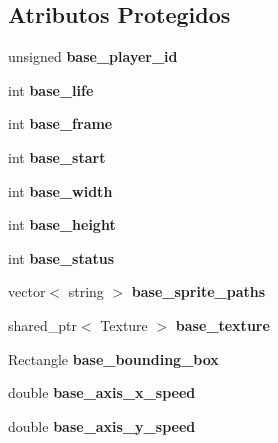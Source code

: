\subsection*{Atributos Protegidos}
\begin{DoxyCompactItemize}
\item 
\mbox{\label{classBase_abfe4b56e9035242ac9a5ceb774ead189}} 
unsigned {\bfseries base\+\_\+player\+\_\+id}
\item 
\mbox{\label{classBase_a3a5ef7ba44286d75ac91b314e8f9bba5}} 
int {\bfseries base\+\_\+life}
\item 
\mbox{\label{classBase_a25115b97013a8f9c19485992943b7bee}} 
int {\bfseries base\+\_\+frame}
\item 
\mbox{\label{classBase_ae6825b079b31eb5e2295fe74000331b6}} 
int {\bfseries base\+\_\+start}
\item 
\mbox{\label{classBase_af14e8b3b3f8e64b94a4a3a5053ffc100}} 
int {\bfseries base\+\_\+width}
\item 
\mbox{\label{classBase_a8af1088a92883b0fec24293143071aab}} 
int {\bfseries base\+\_\+height}
\item 
\mbox{\label{classBase_a0db4876e47d72f19c0959b12c7b8128f}} 
int {\bfseries base\+\_\+status}
\item 
\mbox{\label{classBase_a8010ab166f9a8468d6b1006a6f8efa83}} 
vector$<$ string $>$ {\bfseries base\+\_\+sprite\+\_\+paths}
\item 
\mbox{\label{classBase_a1b641692d4aa3de6b0eb3c9f9ca5d164}} 
shared\+\_\+ptr$<$ Texture $>$ {\bfseries base\+\_\+texture}
\item 
\mbox{\label{classBase_a6a62f99edec994a277fbb2d2b2221966}} 
Rectangle {\bfseries base\+\_\+bounding\+\_\+box}
\item 
\mbox{\label{classBase_af8b1625c4851d929cdd3a10650c6d0f5}} 
double {\bfseries base\+\_\+axis\+\_\+x\+\_\+speed}
\item 
\mbox{\label{classBase_ac472e9bbf37bf28ab3794d51ffb32db3}} 
double {\bfseries base\+\_\+axis\+\_\+y\+\_\+speed}
\end{DoxyCompactItemize}


